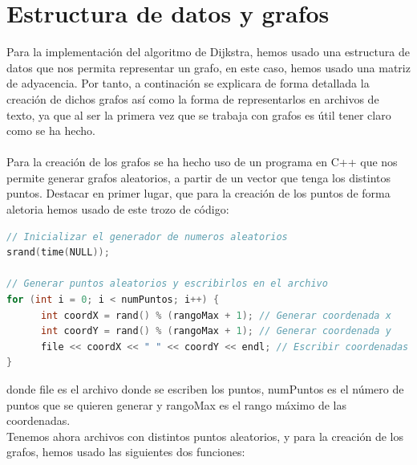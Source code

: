 \documentclass[11pt,openany]{book}
\begin{document}
\section{Estructura de datos y grafos}
Para la implementación del algoritmo de Dijkstra, hemos usado una estructura de datos que nos permita representar un grafo, en este caso,
hemos usado una matriz de adyacencia. Por tanto, a continación se explicara de forma detallada la creación de dichos grafos así como la forma de 
representarlos en archivos de texto, ya que al ser la primera vez que se trabaja con grafos es útil tener
claro como se ha hecho. \\ \\
Para la creación de los grafos se ha hecho uso de un programa en C++ que nos permite generar grafos aleatorios, a partir
de un vector que tenga los distintos puntos. Destacar en primer lugar, que para la creación de los puntos de forma aletoria hemos usado 
de este trozo de código:
\begin{lstlisting}[language=C++]
// Inicializar el generador de numeros aleatorios
srand(time(NULL));

// Generar puntos aleatorios y escribirlos en el archivo
for (int i = 0; i < numPuntos; i++) {
      int coordX = rand() % (rangoMax + 1); // Generar coordenada x
      int coordY = rand() % (rangoMax + 1); // Generar coordenada y
      file << coordX << " " << coordY << endl; // Escribir coordenadas al archivo
}
\end{lstlisting}
donde file es el archivo donde se escriben los puntos, numPuntos es el número de puntos que se quieren generar y rangoMax es el rango
máximo de las coordenadas. \\
Tenemos ahora archivos con distintos puntos aleatorios, y para la creación de los grafos, hemos usado las siguientes dos funciones:
\end{document}
